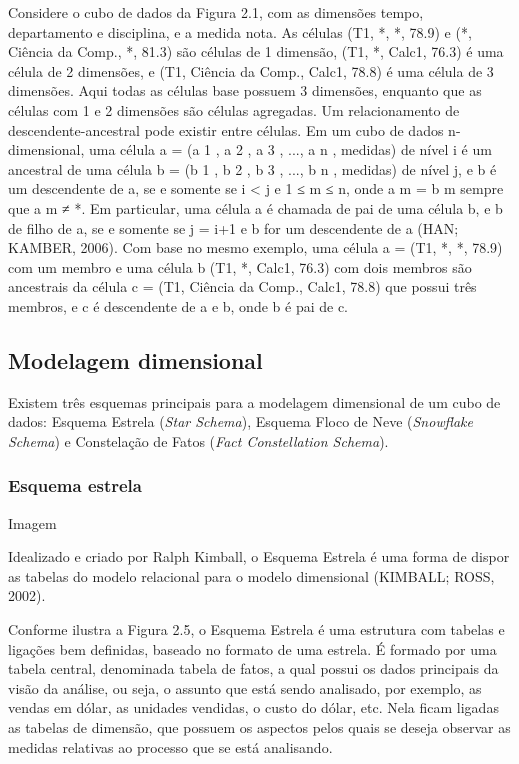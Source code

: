 Considere o cubo de dados da Figura 2.1, com as dimensões tempo, departamento e disciplina, e a medida nota.
As células (T1, *, *, 78.9) e (*, Ciência da Comp., *, 81.3) são células de 1 dimensão, (T1, *, Calc1, 76.3) é uma célula de 2 dimensões, e (T1, Ciência da Comp., Calc1, 78.8) é uma célula de 3 dimensões.
Aqui todas as células base possuem 3 dimensões, enquanto que as células com 1 e 2 dimensões são células agregadas.
Um relacionamento de descendente-ancestral pode existir entre células.
Em um cubo de dados n-dimensional, uma célula a = (a 1 , a 2 , a 3 , ..., a n , medidas) de nível i é um ancestral de uma célula b = (b 1 , b 2 , b 3 , ..., b n , medidas) de nível j, e b é um descendente de a, se e somente se i < j e 1 ≤ m ≤ n, onde a m = b m sempre que a m ≠ *.
Em particular, uma célula a é chamada de pai de uma célula b, e b de filho de a, se e somente se j = i+1 e b for um descendente de a (HAN; KAMBER, 2006).
Com base no mesmo exemplo, uma célula a = (T1, *, *, 78.9) com um membro e uma célula b (T1, *, Calc1, 76.3) com dois membros são ancestrais da célula c = (T1, Ciência da Comp., Calc1, 78.8) que possui três membros, e c é descendente de a e b, onde b é pai de c.

\subsection{Modelagem dimensional}
\label{ch:fun:cube:dimm}

Existem três esquemas principais para a modelagem dimensional de um cubo de dados: Esquema Estrela (\textit{Star Schema}), Esquema Floco de Neve (\textit{Snowflake Schema}) e Constelação de Fatos (\textit{Fact Constellation Schema}).

\subsubsection{Esquema estrela}
\label{ch:fun:cube:dimm:star}

{\color{red} Imagem}

Idealizado e criado por Ralph Kimball, o Esquema Estrela é uma forma de dispor as
tabelas do modelo relacional para o modelo dimensional (KIMBALL; ROSS, 2002).

Conforme ilustra a Figura 2.5, o Esquema Estrela é uma estrutura com tabelas e ligações bem definidas, baseado no formato de uma estrela.
É formado por uma tabela central, denominada tabela de fatos, a qual possui os dados principais da visão da análise, ou seja, o assunto que está sendo analisado, por exemplo, as vendas em dólar, as unidades vendidas, o custo do dólar, etc.
Nela ficam ligadas as tabelas de dimensão, que possuem os aspectos pelos quais se deseja observar as medidas relativas ao processo que se está analisando.

